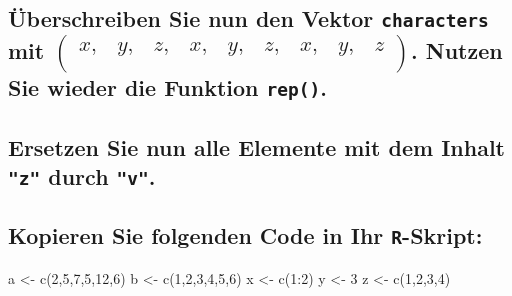 \documentclass[12pt,a4paper]{article}
\newenvironment{Shaded}{\begin{snugshade}}{\end{snugshade}}
\newcommand{\DecValTok}[1]{\textcolor[rgb]{0.00,0.00,0.81}{#1}}
\newcommand{\FunctionTok}[1]{\textcolor[rgb]{0.00,0.00,0.00}{#1}}
\newcommand{\NormalTok}[1]{#1}
\newcommand{\OtherTok}[1]{\textcolor[rgb]{0.56,0.35,0.01}{#1}}
\newcommand{\SpecialCharTok}[1]{\textcolor[rgb]{0.00,0.00,0.00}{#1}}
\begin{document}
\hypertarget{uxfcberschreiben-sie-nun-den-vektor-mit-beginpmatrix-x-y-z-x-y-z-x-y-z-endpmatrix.-nutzen-sie-wieder-die-funktion-.}{%
\subsection{\texorpdfstring{Überschreiben Sie nun den Vektor
\texttt{characters} mit
\linebreak  \(\begin{pmatrix} x, & y, & z, & x, & y, & z, & x, & y, & z \\ \end{pmatrix}\).
Nutzen Sie wieder die Funktion
\texttt{rep()}.}{Überschreiben Sie nun den Vektor  mit \textbackslash begin\{pmatrix\} x, \& y, \& z, \& x, \& y, \& z, \& x, \& y, \& z \textbackslash\textbackslash{} \textbackslash end\{pmatrix\}. Nutzen Sie wieder die Funktion .}}\label{uxfcberschreiben-sie-nun-den-vektor-mit-beginpmatrix-x-y-z-x-y-z-x-y-z-endpmatrix.-nutzen-sie-wieder-die-funktion-.}}

\hypertarget{ersetzen-sie-nun-alle-elemente-mit-dem-inhalt-durch-.}{%
\subsection{\texorpdfstring{Ersetzen Sie nun alle Elemente mit dem
Inhalt \texttt{"z"} durch
\texttt{"v"}.}{Ersetzen Sie nun alle Elemente mit dem Inhalt  durch .}}\label{ersetzen-sie-nun-alle-elemente-mit-dem-inhalt-durch-.}}

\hypertarget{kopieren-sie-folgenden-code-in-ihr--skript}{%
\subsection{\texorpdfstring{Kopieren Sie folgenden Code in Ihr
\texttt{R}-Skript:}{Kopieren Sie folgenden Code in Ihr -Skript:}}\label{kopieren-sie-folgenden-code-in-ihr--skript}}

\begin{Shaded}
\begin{Highlighting}[]
\NormalTok{    a }\OtherTok{\textless{}{-}} \FunctionTok{c}\NormalTok{(}\DecValTok{2}\NormalTok{,}\DecValTok{5}\NormalTok{,}\DecValTok{7}\NormalTok{,}\DecValTok{5}\NormalTok{,}\DecValTok{12}\NormalTok{,}\DecValTok{6}\NormalTok{)}
\NormalTok{    b }\OtherTok{\textless{}{-}} \FunctionTok{c}\NormalTok{(}\DecValTok{1}\NormalTok{,}\DecValTok{2}\NormalTok{,}\DecValTok{3}\NormalTok{,}\DecValTok{4}\NormalTok{,}\DecValTok{5}\NormalTok{,}\DecValTok{6}\NormalTok{)}
\NormalTok{    x }\OtherTok{\textless{}{-}} \FunctionTok{c}\NormalTok{(}\DecValTok{1}\SpecialCharTok{:}\DecValTok{2}\NormalTok{)}
\NormalTok{    y }\OtherTok{\textless{}{-}} \DecValTok{3}
\NormalTok{    z }\OtherTok{\textless{}{-}} \FunctionTok{c}\NormalTok{(}\DecValTok{1}\NormalTok{,}\DecValTok{2}\NormalTok{,}\DecValTok{3}\NormalTok{,}\DecValTok{4}\NormalTok{)}
\end{Highlighting}
\end{Shaded}
\end{document}
